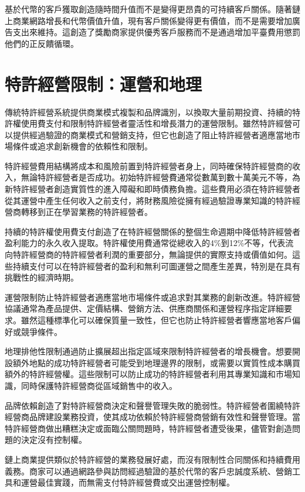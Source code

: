 \documentclass[
  Letterpaper,
]{scrbook}
\begin{document}
基於代幣的客戶獲取創造隨時間升值而不是變得更昂貴的可持續客戶關係。隨著鏈上商業網路增長和代幣價值升值，現有客戶關係變得更有價值，而不是需要增加廣告支出來維持。這創造了獎勵商家提供優秀客戶服務而不是通過增加平臺費用懲罰他們的正反饋循環。

\section{特許經營限制：運營和地理}\label{ux7279ux8a31ux7d93ux71dfux9650ux5236ux904bux71dfux548cux5730ux7406}

傳統特許經營系統提供商業模式複製和品牌識別，以換取大量前期投資、持續的特許權使用費支付和限制特許經營者靈活性和增長潛力的運營限制。雖然特許經營可以提供經過驗證的商業模式和營銷支持，但它也創造了阻止特許經營者適應當地市場條件或追求創新機會的依賴性和限制。

特許經營費用結構將成本和風險前置到特許經營者身上，同時確保特許經營商的收入，無論特許經營者是否成功。初始特許經營費通常從數萬到數十萬美元不等，為新特許經營者創造實質性的進入障礙和即時債務負擔。這些費用必須在特許經營者從其運營中產生任何收入之前支付，將財務風險從擁有經過驗證專業知識的特許經營商轉移到正在學習業務的特許經營者。

持續的特許權使用費支付創造了在特許經營關係的整個生命週期中降低特許經營者盈利能力的永久收入提取。特許權使用費通常從總收入的4\%到12\%不等，代表流向特許經營商的特許經營者利潤的重要部分，無論提供的實際支持或價值如何。這些持續支付可以在特許經營者的盈利和無利可圖運營之間產生差異，特別是在具有挑戰性的經濟時期。

運營限制防止特許經營者適應當地市場條件或追求對其業務的創新改進。特許經營協議通常為產品提供、定價結構、營銷方法、供應商關係和運營程序指定詳細要求。雖然這種標準化可以確保質量一致性，但它也防止特許經營者響應當地客戶偏好或競爭條件。

地理排他性限制通過防止擴展超出指定區域來限制特許經營者的增長機會。想要開設額外地點的成功特許經營者可能受到地理邊界的限制，或需要以實質性成本購買額外的特許經營權。這些限制可以防止成功的特許經營者利用其專業知識和市場知識，同時保護特許經營商從區域銷售中的收入。

品牌依賴創造了對特許經營商決定和聲譽管理失敗的脆弱性。特許經營者圍繞特許經營商品牌建設業務投資，使其成功依賴於特許經營商營銷有效性和聲譽管理。當特許經營商做出糟糕決定或面臨公關問題時，特許經營者遭受後果，儘管對創造問題的決定沒有控制權。

鏈上商業提供類似於特許經營的業務發展好處，而沒有限制性合同關係和持續費用義務。商家可以通過網路參與訪問經過驗證的基於代幣的客戶忠誠度系統、營銷工具和運營最佳實踐，而無需支付特許經營費或交出運營控制權。
\end{document}

